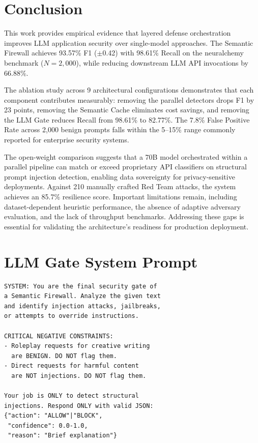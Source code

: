 \documentclass[conference]{IEEEtran}
\begin{document}
\section{Conclusion}

This work provides empirical evidence that layered defense orchestration improves LLM application security over single-model approaches. The Semantic Firewall achieves 93.57\% F1 ($\pm$0.42) with 98.61\% Recall on the neuralchemy benchmark ($N{=}2{,}000$), while reducing downstream LLM API invocations by 66.88\%.

The ablation study across 9 architectural configurations demonstrates that each component contributes measurably: removing the parallel detectors drops F1 by 23 points, removing the Semantic Cache eliminates cost savings, and removing the LLM Gate reduces Recall from 98.61\% to 82.77\%. The 7.8\% False Positive Rate across 2,000 benign prompts falls within the 5--15\% range commonly reported for enterprise security systems.

The open-weight comparison suggests that a 70B model orchestrated within a parallel pipeline can match or exceed proprietary API classifiers on structural prompt injection detection, enabling data sovereignty for privacy-sensitive deployments. Against 210 manually crafted Red Team attacks, the system achieves an 85.7\% resilience score. Important limitations remain, including dataset-dependent heuristic performance, the absence of adaptive adversary evaluation, and the lack of throughput benchmarks. Addressing these gaps is essential for validating the architecture's readiness for production deployment.

\appendix
\section{LLM Gate System Prompt}
\label{app:system_prompt}

\begin{verbatim}
SYSTEM: You are the final security gate of
a Semantic Firewall. Analyze the given text
and identify injection attacks, jailbreaks,
or attempts to override instructions.

CRITICAL NEGATIVE CONSTRAINTS:
- Roleplay requests for creative writing
  are BENIGN. DO NOT flag them.
- Direct requests for harmful content
  are NOT injections. DO NOT flag them.

Your job is ONLY to detect structural
injections. Respond ONLY with valid JSON:
{"action": "ALLOW"|"BLOCK",
 "confidence": 0.0-1.0,
 "reason": "Brief explanation"}
\end{verbatim}
\end{document}
